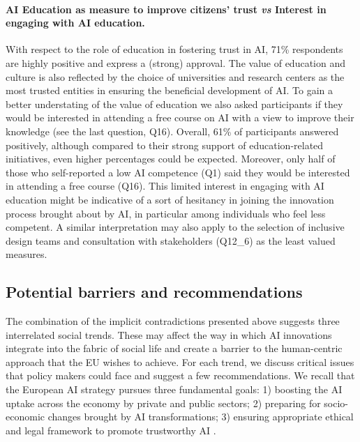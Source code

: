 \documentclass{article}
\begin{document}
\paragraph{\textbf{AI Education as measure to improve citizens' trust \emph{vs} Interest in engaging with AI education}.}
With respect to the role of education in fostering trust in AI, 71\% respondents are highly positive and express a (strong) approval. The value of education and culture is also reflected by the choice of universities and research centers as the most trusted entities in ensuring the beneficial development of AI. To gain a better understating of the value of education we also asked participants if they would be interested in attending a free course on AI with a view to improve their knowledge (see the last question, Q16). Overall, 61\% of participants answered positively, although compared to their strong support of education-related initiatives, even higher percentages could be expected. Moreover, only half of those who self-reported a low AI competence (Q1) said they would be interested in attending a free course (Q16). This limited interest in engaging with AI education might be indicative of a sort of hesitancy in joining the innovation process brought about by AI, in particular among individuals who feel less competent. A similar interpretation may also apply to the selection of inclusive design teams and consultation with stakeholders (Q12\_6) as the least valued measures.

\subsection{Potential barriers and recommendations}

The combination of the implicit contradictions presented above suggests three interrelated social trends. These may affect the way in which AI innovations integrate into the fabric of social life and create a barrier to the human-centric approach that the EU wishes to achieve. For each trend, we discuss critical issues that policy makers could face and suggest a few recommendations. We recall that the European AI strategy pursues three fundamental goals: 1) boosting the AI uptake across the economy by private and public sectors; 2) preparing for socio-economic changes brought by AI transformations; 3) ensuring appropriate ethical and legal framework to promote trustworthy AI \cite{ai_agenda}.
\end{document}
